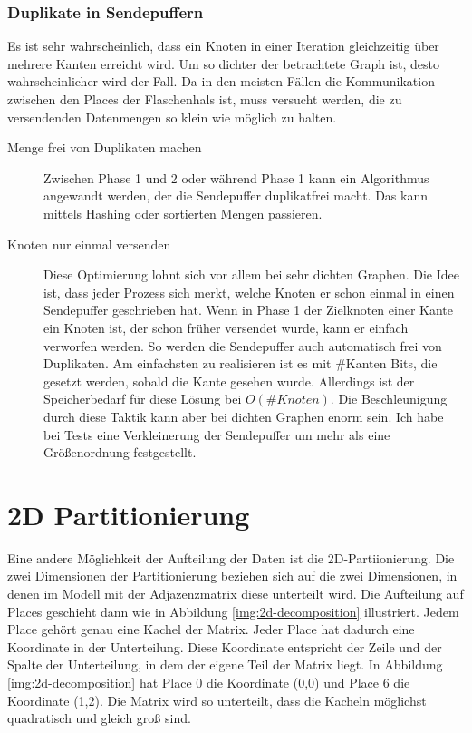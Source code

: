 \subsubsection{Duplikate in Sendepuffern} %
\label{sub:duplikate_in_sendepuffern}
Es ist sehr wahrscheinlich, dass ein Knoten in einer Iteration gleichzeitig über mehrere Kanten erreicht wird. Um so dichter der betrachtete Graph ist, desto wahrscheinlicher wird der Fall. Da in den meisten Fällen die Kommunikation zwischen den Places der Flaschenhals ist, muss versucht werden, die zu versendenden Datenmengen so klein wie möglich zu halten. 
\begin{description}
	\item[Menge frei von Duplikaten machen] Zwischen Phase 1 und 2 oder während Phase 1 kann ein Algorithmus angewandt werden, der die Sendepuffer duplikatfrei macht. Das kann mittels Hashing oder sortierten Mengen passieren.
	\item[Knoten nur einmal versenden] Diese Optimierung lohnt sich vor allem bei sehr dichten Graphen. Die Idee ist, dass jeder Prozess sich merkt, welche Knoten er schon einmal in einen Sendepuffer geschrieben hat. Wenn in Phase 1 der Zielknoten einer Kante ein Knoten ist, der schon früher versendet wurde, kann er einfach verworfen werden. So werden die Sendepuffer auch automatisch frei von Duplikaten. Am einfachsten zu realisieren ist es mit \#Kanten Bits, die gesetzt werden, sobald die Kante gesehen wurde. Allerdings ist der Speicherbedarf für diese Lösung bei $O(\# Knoten)$. Die Beschleunigung durch diese Taktik kann aber bei dichten Graphen enorm sein. Ich habe bei Tests eine Verkleinerung der Sendepuffer um mehr als eine Größenordnung festgestellt.
\end{description}



\section{2D Partitionierung} %
\label{sec:2d_partitionierung}

Eine andere Möglichkeit der Aufteilung der Daten ist die 2D-Partiionierung. Die zwei Dimensionen der Partitionierung beziehen sich auf die zwei Dimensionen, in denen im Modell mit der Adjazenzmatrix diese unterteilt wird. Die Aufteilung auf Places geschieht dann wie in Abbildung \ref{img:2d-decomposition} illustriert. Jedem Place gehört genau eine Kachel der Matrix. Jeder Place hat dadurch eine Koordinate in der Unterteilung. Diese Koordinate entspricht der Zeile und der Spalte der Unterteilung, in dem der eigene Teil der Matrix liegt. In Abbildung \ref{img:2d-decomposition} hat Place 0 die Koordinate (0,0) und Place 6 die Koordinate (1,2). Die Matrix wird so unterteilt, dass die Kacheln möglichst quadratisch und gleich groß sind.

